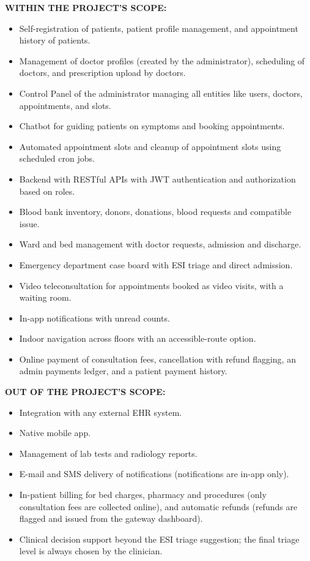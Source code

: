 \textbf{WITHIN THE PROJECT'S SCOPE:}
\begin{itemize}
    \item Self-registration of patients, patient profile management, and appointment history of patients.
    \item Management of doctor profiles (created by the administrator), scheduling of doctors, and prescription upload by doctors.
    \item Control Panel of the administrator managing all entities like users, doctors, appointments, and slots.
    \item Chatbot for guiding patients on symptoms and booking appointments.
    \item Automated appointment slots and cleanup of appointment slots using scheduled cron jobs.
    \item Backend with RESTful APIs with JWT authentication and authorization based on roles.
    \item Blood bank inventory, donors, donations, blood requests and compatible issue.
    \item Ward and bed management with doctor requests, admission and discharge.
    \item Emergency department case board with ESI triage and direct admission.
    \item Video teleconsultation for appointments booked as video visits, with a waiting room.
    \item In-app notifications with unread counts.
    \item Indoor navigation across floors with an accessible-route option.
    \item Online payment of consultation fees, cancellation with refund flagging, an admin payments ledger, and a patient payment history.
\end{itemize}

\textbf{OUT OF THE PROJECT'S SCOPE:}
\begin{itemize}
    \item Integration with any external EHR system.
    \item Native mobile app.
    \item Management of lab tests and radiology reports.
    \item E-mail and SMS delivery of notifications (notifications are in-app only).
    \item In-patient billing for bed charges, pharmacy and procedures (only consultation fees are collected online), and automatic refunds (refunds are flagged and issued from the gateway dashboard).
    \item Clinical decision support beyond the ESI triage suggestion; the final triage level is always chosen by the clinician.
\end{itemize}

